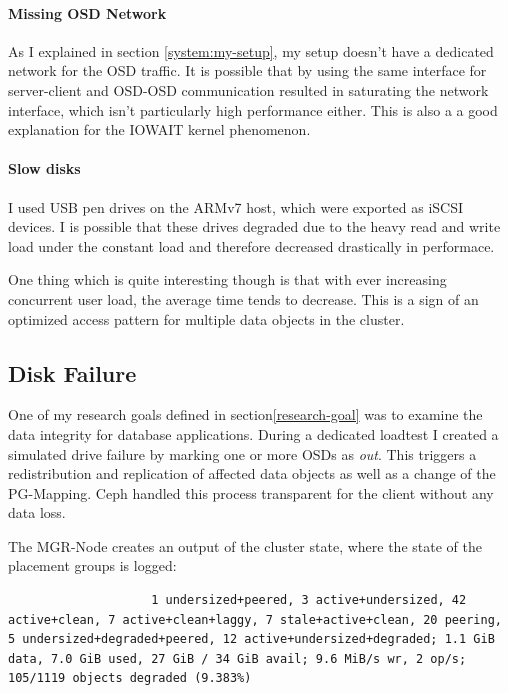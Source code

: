 \documentclass[titlepage, a4paper, 11pt]{scrartcl}
\begin{document}
                \paragraph{Missing OSD Network} As I explained in section \ref*{system:my-setup}, my setup doesn't have a dedicated network for the OSD traffic. It is possible that by using the same interface for server-client and OSD-OSD communication resulted in saturating the network interface, which isn't particularly high performance either. This is also a a good explanation for the IOWAIT kernel phenomenon.

                \paragraph{Slow disks} I used USB pen drives on the ARMv7 host, which were exported as iSCSI devices. I is possible that these drives degraded due to the heavy read and write load under the constant load and therefore decreased drastically in performace.

                One thing which is quite interesting though is that with ever increasing concurrent user load, the average time tends to decrease. This is a sign of an optimized access pattern for multiple data objects in the cluster.

            \subsection{Disk Failure}

                One of my research goals defined in section\ref*{research-goal} was to examine the data integrity for database applications. During a dedicated loadtest I created a simulated drive failure by marking one or more OSDs as \textit{out}. This triggers a redistribution and replication of affected data objects as well as a change of the PG-Mapping. Ceph handled this process transparent for the client without any data loss.

                The MGR-Node creates an output of the cluster state, where the state of the placement groups is logged:

                \begin{lstlisting}
                    1 undersized+peered, 3 active+undersized, 42 active+clean, 7 active+clean+laggy, 7 stale+active+clean, 20 peering, 5 undersized+degraded+peered, 12 active+undersized+degraded; 1.1 GiB data, 7.0 GiB used, 27 GiB / 34 GiB avail; 9.6 MiB/s wr, 2 op/s; 105/1119 objects degraded (9.383%)
                \end{lstlisting}
\end{document}

